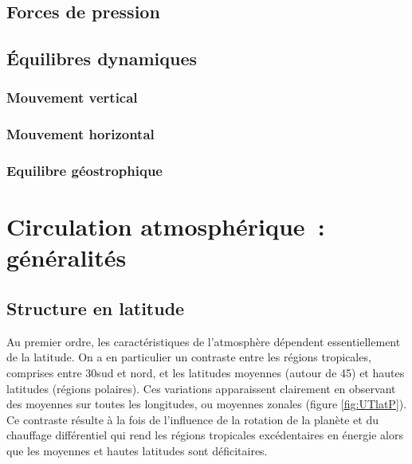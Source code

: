 	

\sk
\subsection{Forces de pression}

	

\sk
\subsection{Équilibres dynamiques}

	
	

\sk
\subsubsection{Mouvement vertical}

	

\sk
\subsubsection{Mouvement horizontal}

	

\sk
\subsubsection{Equilibre géostrophique}

	

\mk
\section{Circulation atmosphérique~: généralités}

\sk
\subsection{Structure en latitude}

\sk
Au premier ordre, les caractéristiques de l'atmosphère dépendent essentiellement de la latitude. On a en particulier un contraste entre les régions tropicales, comprises entre 30\deg sud et nord, et les latitudes moyennes (autour de 45\deg) et hautes latitudes (régions polaires). Ces variations apparaissent clairement en observant des moyennes sur toutes les longitudes, ou moyennes zonales (figure \ref{fig:UTlatP}). Ce contraste résulte à la fois de l'influence de la rotation de la planète et du chauffage différentiel qui rend les régions tropicales excédentaires en énergie alors que les moyennes et hautes latitudes sont déficitaires.

